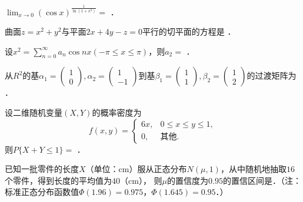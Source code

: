 \documentclass[plain,noanswer,medmath]{../../template/jnuexam}
\begin{document}




\begin{problem}
$\lim_{x \to 0} (\cos x)^{\frac{1}{\ln(1 + x^2)}} =$ \fillin{}．
\end{problem}


\begin{problem}
曲面$z = x^2 + y^2$与平面$2x + 4y - z = 0$平行的切平面的方程是 \fillin{}．
\end{problem}


\begin{problem}
设$x^2 = \sum_{n = 0}^{\infty}a_n \cos nx(- \pi \le x \le \pi)$，则$a_2 =$ \fillin{}．
\end{problem}


\begin{problem}
从$R^2$的基$\alpha_1 = \begin{pmatrix}
  1 \\
  0
\end{pmatrix},\alpha_2 = \begin{pmatrix}
  1 \\
  -1
\end{pmatrix}$到基$\beta_1 = \begin{pmatrix}
  1 \\
  1
\end{pmatrix},\beta_2 = \begin{pmatrix}
  1 \\
  2
\end{pmatrix}$的过渡矩阵为 \fillin{}．
\end{problem}


\begin{problem}
设二维随机变量$(X,Y)$的概率密度为$$f(x,y) = \begin{cases}
  6x, & 0 \le x \le y \le 1, \\
   0, & \text{其他}.
\end{cases}$$
则$P\{X + Y \le 1\} =$ \fillin{}．
\end{problem}


\begin{problem}
已知一批零件的长度$X$（单位：cm）服从正态分布$N(\mu ,1)$，从中随机地抽取$16$个零件，得到长度的平均值为$40$（cm），
则$\mu$的置信度为$0.95$的置信区间是\fillin{}．（注：标准正态分布函数值$\Phi (1.96) = 0.975$，$\Phi (1.645) = 0.95$．）
\end{problem}


\end{document}
